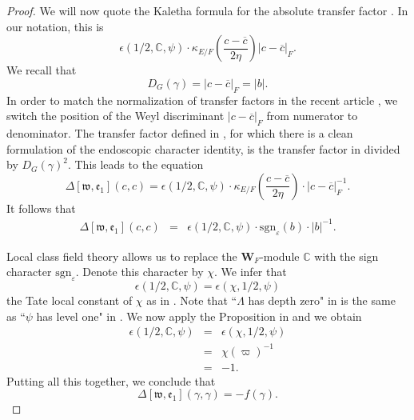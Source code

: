 \documentclass[11pt]{amsart}
\numberwithin{equation}{section}
\def\sgn{\mathrm{sgn}}
\def\fe{\mathfrak{e}}
\def\fw{\mathfrak{w}}
\def\bW{\mathbf{W}}
\def\C{\mathbb{C}}
\newcommand{\<}{\left\langle}
\renewcommand{\>}{\right\rangle}
\begin{document}
\begin{proof}
 We will now quote the Kaletha formula for the absolute transfer factor \cite[Example 3.6.9]{Ka4}.  In our notation, this is
 \begin{equation}\label{Deltadef}
  \epsilon(1/2, \C, \psi) \cdot \kappa_{E/F}\left(\frac{c - \overline{c}}{2\eta}\right) |c - \overline{c}|_F .
 \end{equation}
 We recall that
 \[
 D_G(\gamma) = |c - \overline{c}|_F = |b|.
 \]
 In order to match the normalization of transfer factors in the recent article \cite{AK}, we switch the position of the Weyl discriminant $|c - \overline{c}|_F$ from numerator to denominator.  
The  transfer factor defined in \cite{AK}, for which there is a clean formulation of the endoscopic character identity, is the transfer factor in \cite[p.163]{Ka1} divided by $D_G(\gamma)^2$.
 This leads to the equation
 \begin{equation}\label{Deltadef}
\Delta[\fw, \fe_1](c,c) =  \epsilon(1/2, \C, \psi) \cdot \kappa_{E/F}\left(\frac{c - \overline{c}}{2\eta}\right) \cdot |c - \overline{c}|_F^{-1}.
 \end{equation}
 It follows that
\begin{eqnarray*}
\Delta[\fw, \fe_1](c,c) 
&=& \epsilon(1/2, \C, \psi) \cdot \sgn_\varepsilon(b) \cdot |b|^{-1}.
\end{eqnarray*}

 Local class field theory allows us to replace the $\bW_F$-module $\C$ with the sign character 
 $ \sgn_\varepsilon$.  Denote this character by $\chi$.   We infer that
 \[
 \epsilon(1/2, \C, \psi) = \epsilon(\chi, 1/2, \psi)
 \]
 the Tate local constant of $\chi$ as in \cite[\S23.4]{BH}.   Note that ``$\Lambda$ has depth zero" in \cite{ADSS} is the same as 
 ``$\psi$ has level one"  in \cite{BH}.   We now apply the Proposition in \cite[\S23.5]{BH} and we obtain
 \begin{eqnarray*}
 \epsilon(1/2, \C, \psi) &=& \epsilon(\chi, 1/2, \psi)\\
 &=& \chi(\varpi)^{-1}\\
 &=& -1.
 \end{eqnarray*}
Putting all this together, we conclude that 
\begin{equation}\label{Delta7}
\Delta[\fw, \fe_1](\gamma , \gamma) = - f(\gamma).
\end{equation}



\end{proof}
\end{document}
